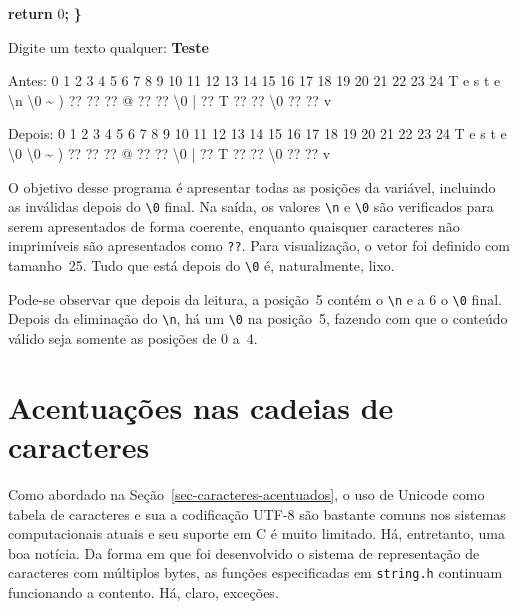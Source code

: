 \documentclass[
  11pt,
  a4paper,
]{scrbook}
\newenvironment{Shaded}{\begin{snugshade}}{\end{snugshade}}
\newcommand{\ControlFlowTok}[1]{\textcolor[rgb]{0.13,0.29,0.53}{\textbf{#1}}}
\newcommand{\DecValTok}[1]{\textcolor[rgb]{0.00,0.00,0.81}{#1}}
\newcommand{\KeywordTok}[1]{\textcolor[rgb]{0.13,0.29,0.53}{\textbf{#1}}}
\newcommand{\NormalTok}[1]{#1}
\newcommand{\OperatorTok}[1]{\textcolor[rgb]{0.81,0.36,0.00}{\textbf{#1}}}
\begin{document}
\begin{Shaded}
\begin{Highlighting}[]
    \ControlFlowTok{return} \DecValTok{0}\OperatorTok{;}
\OperatorTok{\}}
\end{Highlighting}
\end{Shaded}

\begin{Shaded}
\begin{Highlighting}[]
\NormalTok{Digite um texto qualquer:}
\KeywordTok{ Teste }

\NormalTok{Antes:}
\NormalTok{  0  1  2  3  4  5  6  7  8  9 10 11 12 13 14 15 16 17 18 19 20 21 22 23 24}
\NormalTok{  T  e  s  t  e \textbackslash{}n \textbackslash{}0  \textasciitilde{}  ) ?? ?? ??  @ ?? ?? \textbackslash{}0  | ??  T ?? ?? \textbackslash{}0 ?? ??  v}

\NormalTok{Depois:}
\NormalTok{  0  1  2  3  4  5  6  7  8  9 10 11 12 13 14 15 16 17 18 19 20 21 22 23 24}
\NormalTok{  T  e  s  t  e \textbackslash{}0 \textbackslash{}0  \textasciitilde{}  ) ?? ?? ??  @ ?? ?? \textbackslash{}0  | ??  T ?? ?? \textbackslash{}0 ?? ??  v}
\end{Highlighting}
\end{Shaded}

O objetivo desse programa é apresentar todas as posições da variável,
incluindo as inválidas depois do \texttt{\textbackslash{}0} final. Na
saída, os valores \texttt{\textbackslash{}n} e
\texttt{\textbackslash{}0} são verificados para serem apresentados de
forma coerente, enquanto quaisquer caracteres não imprimíveis são
apresentados como \texttt{??}. Para visualização, o vetor foi definido
com tamanho~25. Tudo que está depois do \texttt{\textbackslash{}0} é,
naturalmente, lixo.

Pode-se observar que depois da leitura, a posição~5 contém o
\texttt{\textbackslash{}n} e a 6 o \texttt{\textbackslash{}0} final.
Depois da eliminação do \texttt{\textbackslash{}n}, há um
\texttt{\textbackslash{}0} na posição~5, fazendo com que o conteúdo
válido seja somente as posições de 0 a~4.

\section{Acentuações nas cadeias de
caracteres}\label{sec-acentuacao-em-strings}

Como abordado na Seção~\ref{sec-caracteres-acentuados}, o uso de Unicode
como tabela de caracteres e sua a codificação UTF-8 são bastante comuns
nos sistemas computacionais atuais e seu suporte em C é muito limitado.
Há, entretanto, uma boa notícia. Da forma em que foi desenvolvido o
sistema de representação de caracteres com múltiplos bytes, as funções
especificadas em \texttt{string.h} continuam funcionando a contento. Há,
claro, exceções.
\end{document}
